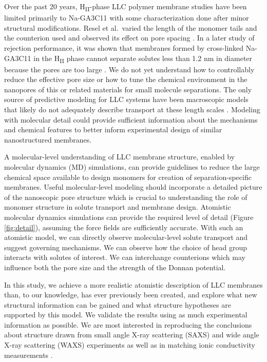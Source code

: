 \documentclass[journal=jpcbfk,manuscript=article]{achemso}
\begin{document}
  Over the past 20 years, H\textsubscript{II}-phase LLC
  polymer membrane studies have been limited primarily to Na-GA3C11 with some
  characterization done after minor structural modifications. Resel et al.~varied
  the length of the monomer tails and the counterion used and observed its effect
  on pore spacing \cite{resel_structural_2000}.  In a later study of rejection
  performance, it was shown that membranes formed by cross-linked Na-GA3C11 in
  the H\textsubscript{II} phase cannot separate solutes less than 1.2 nm in
  diameter because the pores are too large \cite{zhou_supported_2005}. We do not
  yet understand how to controllably reduce the effective pore size or how to
  tune the chemical environment in the nanopores of this or related materials for
  small molecule separations. The only source of predictive modeling for LLC
  systems have been macroscopic models that likely do not adequately describe
  transport at these length scales \cite{hatakeyama_water_2011}. Modeling with
  molecular detail could provide sufficient information about the mechanisms and
  chemical features to better inform experimental design of similar
  nanostructured membranes. 


  A molecular-level understanding of LLC membrane structure, enabled by
  molecular dynamics (MD) simulations, can provide guidelines to reduce the large
  chemical space available to design monomers for creation of separation-specific
  membranes. Useful molecular-level modeling should incorporate a detailed picture of the
  nanoscopic pore structure which is crucial to understanding the role of
  monomer structure in solute transport and membrane design. 
  Atomistic molecular dynamics simulations can provide the required level of detail
  (Figure \ref{fig:detail}), assuming the force fields are sufficiently accurate.
  With such an atomistic model, we can directly observe molecular-level solute
  transport and suggest governing mechanisms. We can observe how the choice of
  head group interacts with solutes of interest. We can interchange
  counterions which may influence both the pore size and the strength of the
  Donnan potential. 

  In this study, we achieve a  more realistic atomistic description of LLC
  membranes than, to our knowledge, has ever previously been created, and explore
  what new structural information can be gained and what structure hypotheses are
  supported by this model. We validate the results using as much experimental
  information as possible. We are most interested in reproducing the conclusions
  about structure drawn from small angle X-ray scattering (SAXS) and wide angle
  X-ray scattering (WAXS) experiments as well as in matching ionic conductivity
  measurements \cite{feng_thin_2016}.
\end{document}
